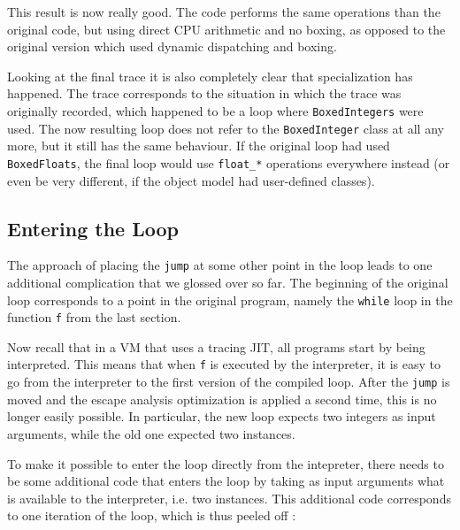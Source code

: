 \documentclass{sigplanconf}
\let\oldcite=\cite
\renewcommand\cite[1]{\ifthenelse{\equal{#1}{XXX}}{[citation~needed]}{\oldcite{#1}}}
\begin{document}
This result is now really good. The code performs the same operations than
the original code, but using direct CPU arithmetic and no boxing, as opposed to
the original version which used dynamic dispatching and boxing.

Looking at the final trace it is also completely clear that specialization has
happened. The trace corresponds to the situation in which the trace was
originally recorded, which happened to be a loop where \texttt{BoxedIntegers} were
used. The now resulting loop does not refer to the \texttt{BoxedInteger} class at
all any more, but it still has the same behaviour. If the original loop had
used \texttt{BoxedFloats}, the final loop would use \texttt{float\_*} operations
everywhere instead (or even be very different, if the object model had
user-defined classes).



\subsection{Entering the Loop}

The approach of placing the \texttt{jump} at some other point in the loop leads to
one additional complication that we glossed over so far. The beginning of the
original loop corresponds to a point in the original program, namely the
\texttt{while} loop in the function \texttt{f} from the last section.

Now recall that in a VM that uses a tracing JIT, all programs start by being
interpreted. This means that when \texttt{f} is executed by the interpreter, it is
easy to go from the interpreter to the first version of the compiled loop.
After the \texttt{jump} is moved and the escape analysis optimization is applied a
second time, this is no longer easily possible.  In particular, the new loop
expects two integers as input arguments, while the old one expected two
instances.

To make it possible to enter the loop directly from the intepreter, there
needs to be some additional code that enters the loop by taking as input
arguments what is available to the interpreter, i.e. two instances. This
additional code corresponds to one iteration of the loop, which is thus
peeled off \cite{XXX}:
\end{document}
